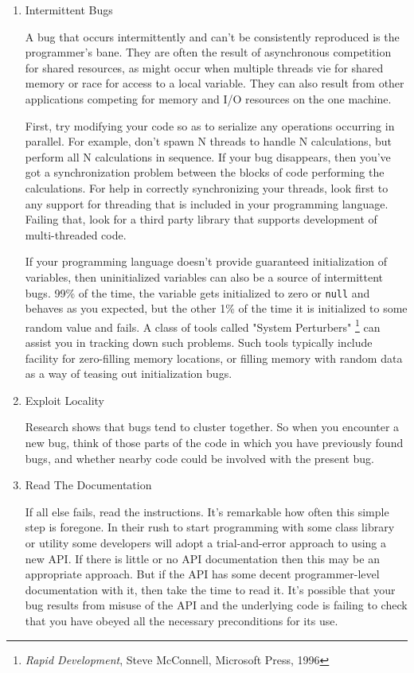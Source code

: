 \documentclass{article}
\begin{document}
\begin{enumerate}
\begin{enumerate}
\item Intermittent Bugs
\label{sec:orgheadline312}

A bug that occurs intermittently and can't be consistently reproduced is
the programmer's bane. They are often the result of asynchronous
competition for shared resources, as might occur when multiple threads
vie for shared memory or race for access to a local variable. They can
also result from other applications competing for memory and I/O
resources on the one machine.

First, try modifying your code so as to serialize any operations
occurring in parallel. For example, don't spawn N threads to handle N
calculations, but perform all N calculations in sequence. If your bug
disappears, then you've got a synchronization problem between the blocks
of code performing the calculations. For help in correctly synchronizing
your threads, look first to any support for threading that is included
in your programming language. Failing that, look for a third party
library that supports development of multi-threaded code.

If your programming language doesn't provide guaranteed initialization
of variables, then uninitialized variables can also be a source of
intermittent bugs. 99\% of the time, the variable gets initialized to
zero or \texttt{null} and behaves as you expected, but the other 1\% of the time
it is initialized to some random value and fails. A class of tools
called "System Perturbers" \footnote{\emph{Rapid Development}, Steve McConnell, Microsoft Press, 1996} can assist you in tracking down such
problems. Such tools typically include facility for zero-filling memory
locations, or filling memory with random data as a way of teasing out
initialization bugs.

\item Exploit Locality
\label{sec:orgheadline313}

Research shows that bugs tend to cluster together. So when you encounter
a new bug, think of those parts of the code in which you have previously
found bugs, and whether nearby code could be involved with the present
bug.

\item Read The Documentation
\label{sec:orgheadline314}

If all else fails, read the instructions. It's remarkable how often this
simple step is foregone. In their rush to start programming with some
class library or utility some developers will adopt a trial-and-error
approach to using a new API. If there is little or no API documentation
then this may be an appropriate approach. But if the API has some decent
programmer-level documentation with it, then take the time to read it.
It's possible that your bug results from misuse of the API and the
underlying code is failing to check that you have obeyed all the
necessary preconditions for its use.


\end{enumerate}
\end{enumerate}
\end{document}
